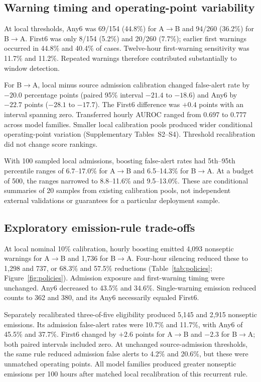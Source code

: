 \documentclass[preprint,12pt]{elsarticle}
\newcommand{\anysix}{Any6}
\newcommand{\firstsix}{First6}
\begin{document}
\subsection{Warning timing and operating-point variability}
At local thresholds, \anysix{} was 69/154 (44.8\%) for A$\to$B and 94/260 (36.2\%) for B$\to$A. \firstsix{} was only 8/154 (5.2\%) and 20/260 (7.7\%); earlier first warnings occurred in 44.8\% and 40.4\% of cases. Twelve-hour first-warning sensitivity was 11.7\% and 11.2\%. Repeated warnings therefore contributed substantially to window detection.

For B$\to$A, local minus source admission calibration changed false-alert rate by $-20.0$ percentage points (paired 95\% interval $-21.4$ to $-18.6$) and \anysix{} by $-22.7$ points ($-28.1$ to $-17.7$). The \firstsix{} difference was $+0.4$ points with an interval spanning zero. Transferred hourly AUROC ranged from 0.697 to 0.777 across model families. Smaller local calibration pools produced wider conditional operating-point variation (Supplementary Tables~S2--S4). Threshold recalibration did not change score rankings.

With 100 sampled local admissions, boosting false-alert rates had 5th--95th percentile ranges of 6.7--17.0\% for A$\to$B and 6.5--14.3\% for B$\to$A. At a budget of 500, the ranges narrowed to 8.8--11.6\% and 9.5--13.0\%. These are conditional summaries of 20 samples from existing calibration pools, not independent external validations or guarantees for a particular deployment sample.

\subsection{Exploratory emission-rule trade-offs}
At local nominal 10\% calibration, hourly boosting emitted 4,093 nonseptic warnings for A$\to$B and 1,736 for B$\to$A. Four-hour silencing reduced these to 1,298 and 737, or 68.3\% and 57.5\% reductions (Table~\ref{tab:policies}; Figure~\ref{fig:policies}). Admission exposure and first-warning timing were unchanged. \anysix{} decreased to 43.5\% and 34.6\%. Single-warning emission reduced counts to 362 and 380, and its \anysix{} necessarily equaled \firstsix{}.

Separately recalibrated three-of-five eligibility produced 5,145 and 2,915 nonseptic emissions. Its admission false-alert rates were 10.7\% and 11.7\%, with \anysix{} of 45.5\% and 37.7\%. \firstsix{} changed by $+2.6$ points for A$\to$B and $-2.3$ for B$\to$A; both paired intervals included zero. At unchanged source-admission thresholds, the same rule reduced admission false alerts to 4.2\% and 20.6\%, but these were unmatched operating points. All model families produced greater nonseptic emissions per 100 hours after matched local recalibration of this recurrent rule.
\end{document}
